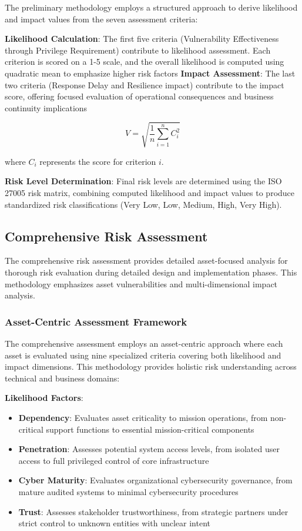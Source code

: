 \documentclass[binding=0.6cm]{sapthesis}
\begin{document}
The preliminary methodology employs a structured approach to derive likelihood and impact values from the seven assessment criteria:

\textbf{Likelihood Calculation}: The first five criteria (Vulnerability Effectiveness through Privilege Requirement) contribute to likelihood assessment. Each criterion is scored on a 1-5 scale, and the overall likelihood is computed using quadratic mean to emphasize higher risk factors
\textbf{Impact Assessment}: The last two criteria (Response Delay and Resilience impact) contribute to the impact score, offering focused evaluation of operational consequences and business continuity implications

$$V = \sqrt{\frac{1}{n}\sum_{i=1}^{n} C_i^2}$$

where $C_i$ represents the score for criterion $i$.


\textbf{Risk Level Determination}: Final risk levels are determined using the ISO 27005 risk matrix, combining computed likelihood and impact values to produce standardized risk classifications (Very Low, Low, Medium, High, Very High).

\subsection{Comprehensive Risk Assessment}

The comprehensive risk assessment provides detailed asset-focused analysis for thorough risk evaluation during detailed design and implementation phases. This methodology emphasizes asset vulnerabilities and multi-dimensional impact analysis.

\subsubsection{Asset-Centric Assessment Framework}

The comprehensive assessment employs an asset-centric approach where each asset is evaluated using nine specialized criteria covering both likelihood and impact dimensions. This methodology provides holistic risk understanding across technical and business domains:

\textbf{Likelihood Factors}:
\begin{itemize}
    \item \textbf{Dependency}: Evaluates asset criticality to mission operations, from non-critical support functions to essential mission-critical components
    \item \textbf{Penetration}: Assesses potential system access levels, from isolated user access to full privileged control of core infrastructure
    \item \textbf{Cyber Maturity}: Evaluates organizational cybersecurity governance, from mature audited systems to minimal cybersecurity procedures
    \item \textbf{Trust}: Assesses stakeholder trustworthiness, from strategic partners under strict control to unknown entities with unclear intent
\end{itemize}
\end{document}
